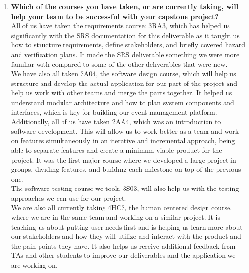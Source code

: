 \begin{enumerate}
  \item \textbf{Which of the courses you have taken, or are currently taking, will help your team to be successful with your capstone project?} \\ 
  All of us have taken the requirements course: 3RA3, which has helped us significantly with the SRS documentation for this deliverable as it taught us how to structure requirements, define stakeholders, and briefly covered hazard and verification plans. It made the SRS deliverable something we were more familiar with compared to some of the other deliverables that were new.\\
  We have also all taken 3A04, the software design course, which will help us structure and develop the actual application for our part of the project and help us work with other teams and merge the parts together. It helped us understand modular architecture and how to plan system components and interfaces, which is key for building our event management platform.\\
  Additionally, all of us have taken 2AA4, which was an introduction to software development. This will allow us to work better as a team and work on features simultaneously in an iterative and incremental approach, being able to separate features and create a minimum viable product for the project. It was the first major course where we developed a large project in groups, dividing features, and building each milestone on top of the previous one.\\
  The software testing course we took, 3S03, will also help us with the testing approaches we can use for our project.\\
  We are also all currently taking 4HC3, the human centered design course, where we are in the same team and working on a similar project. It is teaching us about putting user needs first and is helping us learn more about our stakeholders and how they will utilize and interact with the product and the pain points they have. It also helps us receive additional feedback from TAs and other students to improve our deliverables and the application we are working on.


\end{enumerate}
